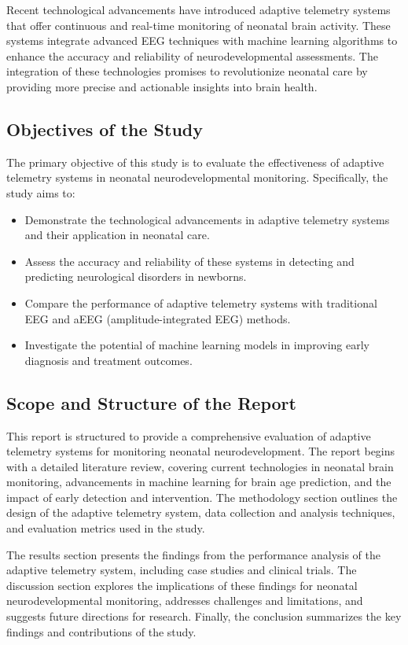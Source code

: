 \documentclass[12pt,journal,compsoc]{IEEEtran}
\begin{document}
Recent technological advancements have introduced adaptive telemetry systems that offer continuous and real-time monitoring of neonatal brain activity. These systems integrate advanced EEG techniques with machine learning algorithms to enhance the accuracy and reliability of neurodevelopmental assessments. The integration of these technologies promises to revolutionize neonatal care by providing more precise and actionable insights into brain health.

\subsection{Objectives of the Study}
The primary objective of this study is to evaluate the effectiveness of adaptive telemetry systems in neonatal neurodevelopmental monitoring. Specifically, the study aims to:
\begin{itemize}
    \item Demonstrate the technological advancements in adaptive telemetry systems and their application in neonatal care.
    \item Assess the accuracy and reliability of these systems in detecting and predicting neurological disorders in newborns.
    \item Compare the performance of adaptive telemetry systems with traditional EEG and aEEG (amplitude-integrated EEG) methods.
    \item Investigate the potential of machine learning models in improving early diagnosis and treatment outcomes.
\end{itemize}

\subsection{Scope and Structure of the Report}
This report is structured to provide a comprehensive evaluation of adaptive telemetry systems for monitoring neonatal neurodevelopment. The report begins with a detailed literature review, covering current technologies in neonatal brain monitoring, advancements in machine learning for brain age prediction, and the impact of early detection and intervention. The methodology section outlines the design of the adaptive telemetry system, data collection and analysis techniques, and evaluation metrics used in the study.

The results section presents the findings from the performance analysis of the adaptive telemetry system, including case studies and clinical trials. The discussion section explores the implications of these findings for neonatal neurodevelopmental monitoring, addresses challenges and limitations, and suggests future directions for research. Finally, the conclusion summarizes the key findings and contributions of the study.
\end{document}

